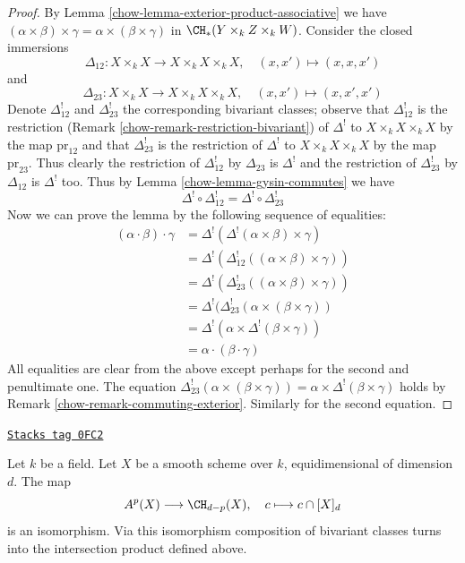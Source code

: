 \begin{proof}

By Lemma \ref{chow-lemma-exterior-product-associative} we have
$(\alpha \times \beta) \times \gamma =
\alpha \times (\beta \times \gamma)$ in $\CH_*(Y \times_k Z \times_k W)$.
Consider the closed immersions
$$
\Delta_{12} : X \times_k X \longrightarrow X \times_k X \times_k X,
\quad (x, x') \mapsto (x, x, x')
$$
and
$$
\Delta_{23} : X \times_k X \longrightarrow X \times_k X \times_k X,
\quad (x, x') \mapsto (x, x', x')
$$
Denote $\Delta_{12}^!$ and $\Delta_{23}^!$ the corresponding bivariant
classes; observe that $\Delta_{12}^!$ is the restriction
(Remark \ref{chow-remark-restriction-bivariant}) of $\Delta^!$
to $X \times_k X \times_k X$ by the map $\text{pr}_{12}$ and that
$\Delta_{23}^!$ is the restriction of $\Delta^!$
to $X \times_k X \times_k X$ by the map $\text{pr}_{23}$.
Thus clearly the restriction of $\Delta_{12}^!$ by $\Delta_{23}$
is $\Delta^!$ and the restriction of $\Delta_{23}^!$ by $\Delta_{12}$ is
$\Delta^!$ too. Thus by Lemma \ref{chow-lemma-gysin-commutes} we have
$$
\Delta^! \circ \Delta_{12}^! =
\Delta^! \circ \Delta_{23}^!
$$
Now we can prove the lemma by the following sequence of equalities:
\begin{align*}
(\alpha \cdot \beta) \cdot \gamma
& =
\Delta^!(\Delta^!(\alpha \times \beta) \times \gamma) \\
& =
\Delta^!(\Delta_{12}^!((\alpha \times \beta) \times \gamma)) \\
& =
\Delta^!(\Delta_{23}^!((\alpha \times \beta) \times \gamma)) \\
& =
\Delta^!(\Delta_{23}^!(\alpha \times (\beta \times \gamma)) \\
& =
\Delta^!(\alpha \times \Delta^!(\beta \times \gamma)) \\
& =
\alpha \cdot (\beta \cdot \gamma)
\end{align*}
All equalities are clear from the above except perhaps
for the second and penultimate one. The equation
$\Delta_{23}^!(\alpha \times (\beta \times \gamma)) =
\alpha \times \Delta^!(\beta \times \gamma)$ holds by
Remark \ref{chow-remark-commuting-exterior}. Similarly for the second
equation.
\end{proof}

\begin{lemma}
\label{chow-lemma-identify-chow-for-smooth}
\href{https://stacks.math.columbia.edu/tag/0FC2}{\texttt{Stacks tag 0FC2}}

Let $k$ be a field. Let $X$ be a smooth scheme over $k$, equidimensional
of dimension $d$. The map
$$
A^p(X) \longrightarrow \CH_{d - p}(X),\quad
c \longmapsto c \cap [X]_d
$$
is an isomorphism. Via this isomorphism composition of bivariant
classes turns into the intersection product defined above.
\end{lemma}

